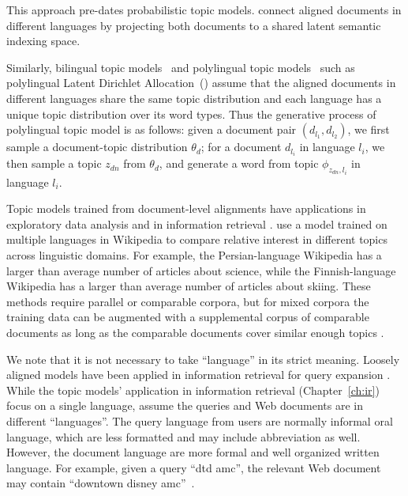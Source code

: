 This approach pre-dates probabilistic topic models.
\citet{Landauer-1990} connect aligned documents in different languages
by projecting both documents to a shared latent semantic indexing
space.

Similarly, bilingual topic models~\citep{zhao-06,DeSmet-09} and polylingual topic models~\citep{mimno-09}
such as polylingual Latent Dirichlet Allocation~(\plda{})
assume that the aligned documents in different languages share the
same topic distribution and each language has a unique topic
distribution over its word types.
Thus the generative process of polylingual topic model is as follows:
given a document pair $(d_{l_1}, d_{l_2})$, we first sample a
document-topic distribution $\theta_d$; for a document $d_{l_i}$ in
language $l_i$, we then sample a topic $z_{dn}$ from $\theta_d$, and
generate a word from topic $\phi_{z_{dn}, l_i}$ in language $l_i$.

Topic models trained from document-level alignments have applications in exploratory data analysis and in information retrieval \citep{vulic2013cross}.
\citet{mimno-09} use a model trained on multiple languages in Wikipedia to compare relative interest in different topics across linguistic domains.
For example, the Persian-language Wikipedia has a larger than average number of articles about science, while the Finnish-language Wikipedia has a larger than average number of articles about skiing.
These methods require parallel or comparable corpora, but for mixed corpora the training data can be augmented with a supplemental corpus of comparable documents as long as  the comparable documents cover similar enough topics \citep{mimno-12b}.

We note that it is not necessary to take ``language'' in its strict meaning.
Loosely aligned models have been applied in information retrieval for query expansion \citep{Gao-2011,Gao-2012}. 
While the topic models' application in information retrieval (Chapter~\ref{ch:ir}) focus
on a single language, \cite{Gao-2011} assume the queries and Web documents are in
different ``languages''. The query language from users are normally informal oral language, 
which are less formatted and may include abbreviation as well. However, the document language
are more formal and well organized written language. For example, given a query ``dtd amc'',
the relevant Web document may contain ``downtown disney amc''~\citep{Jiang-2016}. 

